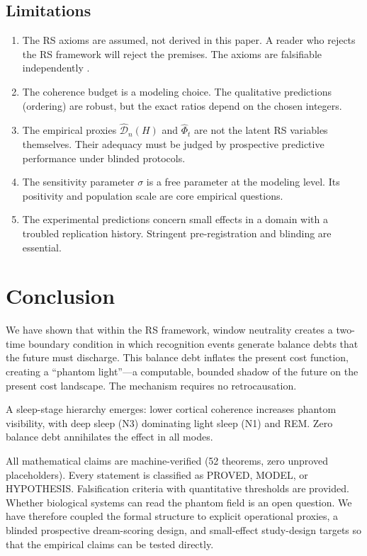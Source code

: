 \documentclass[11pt, a4paper]{article}
\theoremstyle{definition}
\theoremstyle{remark}
\begin{document}
\subsection{Limitations}

\begin{enumerate}
    \item The RS axioms are assumed, not derived in this paper. A
    reader who rejects the RS framework will reject the premises.
    The axioms are falsifiable independently
    \cite{RSAxioms2025,RSFermionMasses2025}.
    \item The coherence budget is a modeling choice. The qualitative
    predictions (ordering) are robust, but the exact ratios depend
    on the chosen integers.
    \item The empirical proxies
    $\widehat{\mathcal{D}}_n(H)$ and $\widehat{\Phi}_t$ are not the
    latent RS variables themselves. Their adequacy must be judged by
    prospective predictive performance under blinded protocols.
    \item The sensitivity parameter $\sigma$ is a free parameter at
    the modeling level. Its positivity and population scale are core
    empirical questions.
    \item The experimental predictions concern small effects in a
    domain with a troubled replication history. Stringent
    pre-registration and blinding are essential.
\end{enumerate}


\section{Conclusion}\label{sec:conclusion}

We have shown that within the RS framework, window neutrality creates
a two-time boundary condition in which recognition events generate
balance debts that the future must discharge. This balance debt
inflates the present cost function, creating a ``phantom
light''---a computable, bounded shadow of the future on the present
cost landscape. The mechanism requires no retrocausation.

A sleep-stage hierarchy emerges: lower cortical coherence increases
phantom visibility, with deep sleep (N3) dominating light sleep (N1)
and REM. Zero balance debt annihilates the effect in all modes.

All mathematical claims are machine-verified (52 theorems, zero
unproved placeholders). Every statement is classified as PROVED,
MODEL, or HYPOTHESIS. Falsification criteria with quantitative
thresholds are provided. Whether biological systems can read the
phantom field is an open question. We have therefore coupled the
formal structure to explicit operational proxies, a blinded
prospective dream-scoring design, and small-effect study-design
targets so that the empirical claims can be tested directly.
\end{document}
